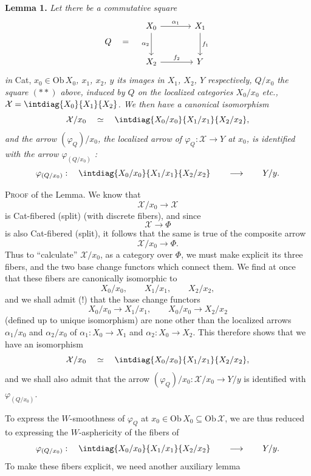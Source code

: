 \noindent\textbf{Lemma 1.} \textit{Let there be a commutative square}
\[
Q \quad = \quad
\begin{tikzcd}[row sep=large,column sep=large]
X_0 \arrow[r, "\alpha_1"] \arrow[d, "\alpha_2"'] & X_1 \arrow[d, "f_1"] \\
X_2 \arrow[r, "f_2"] & Y
\end{tikzcd}
\]
\textit{in} Cat, \textit{$x_0\in\mathrm{Ob}\,X_0$, $x_1$, $x_2$, $y$ its images in $X_1$, $X_2$, $Y$ respectively, $Q/x_0$ the square $(**)$ above, induced by $Q$ on the localized categories $X_0/x_0$ etc., $\mathcal{X} = \intdiag{X_0}{X_1}{X_2}$. We then have a}
\textit{canonical isomorphism}
\[
\mathcal{X}/x_0 \quad\simeq\quad \intdiag{X_0/x_0}{X_1/x_1}{X_2/x_2} ,
\]
\textit{and the arrow $(\varphi_Q)/x_0$, the localized arrow of $\varphi_Q : \mathcal{X}\longrightarrow Y$ at $x_0$, is identified with the arrow $\varphi_{(Q/x_0)}$ :}
\[
\varphi_{(Q/x_0)} : \quad \intdiag{X_0/x_0}{X_1/x_1}{X_2/x_2} \qquad\longrightarrow\qquad Y/y.
\]

\noindent\textsc{Proof} of the Lemma. We know that
\[
\mathcal{X}/x_0\longrightarrow\mathcal{X}
\]
is Cat-fibered (split) (with discrete fibers), and since
\[
\mathcal{X}\longrightarrow\Phi
\]
is also Cat-fibered (split), it follows that the same is true of the composite arrow
\[
\mathcal{X}/x_0\longrightarrow\Phi.
\]
Thus to ``calculate'' $\mathcal{X}/x_0$, as a category over $\Phi$, we must make explicit its three fibers, and the two base change functors which connect them. We find at once that these fibers are canonically isomorphic to
\[
X_0/x_0, \qquad X_1/x_1, \qquad X_2/x_2,
\]
and we shall admit (!) that the base change functors
\[
X_0/x_0\longrightarrow X_1/x_1, \qquad X_0/x_0\longrightarrow X_2/x_2
\]
(defined up to unique isomorphism) are none other than the localized arrows $\alpha_1/x_0$ and $\alpha_2/x_0$ of $\alpha_1 : X_0\longrightarrow X_1$ and $\alpha_2 : X_0\longrightarrow X_2$. This therefore shows that we have an isomorphism
\[
\mathcal{X}/x_0 \quad\simeq\quad \intdiag{X_0/x_0}{X_1/x_1}{X_2/x_2} ,
\]
and we shall also admit that the arrow $(\varphi_Q)/x_0 : \mathcal{X}/x_0\longrightarrow Y/y$ is identified with $\varphi_{(Q/x_0)}$.

To express the $W$-smoothness of $\varphi_Q$ at $x_0\in\mathrm{Ob}\,X_0\subseteq\mathrm{Ob}\,\mathcal{X}$, we are thus reduced to expressing the $W$-asphericity of the fibers of
\[
\varphi_{(Q/x_0)} : \quad \intdiag{X_0/x_0}{X_1/x_1}{X_2/x_2} \qquad\longrightarrow\qquad Y/y.
\]
To make these fibers explicit, we need another auxiliary lemma

